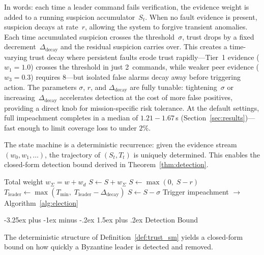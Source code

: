 \documentclass[conference]{IEEEtran}
\makeatletter
\renewcommand{\subsection}{\@startsection{subsection}{2}{\z@}%
  {-3.25ex plus -1ex minus -.2ex}%
  {1.5ex plus .2ex}%
  {\normalfont\normalsize\itshape\centering}}
\makeatother
\begin{document}
In words: each time a leader command fails verification, the evidence weight is added to a running suspicion accumulator~$S_t$. When no fault evidence is present, suspicion decays at rate~$r$, allowing the system to forgive transient anomalies. Each time accumulated suspicion crosses the threshold~$\sigma$, trust drops by a fixed decrement~$\Delta_{\text{decay}}$ and the residual suspicion carries over. This creates a time-varying trust decay where persistent faults erode trust rapidly---Tier~1 evidence ($w_1{=}1.0$) crosses the threshold in just 2~commands, while weaker peer evidence ($w_3{=}0.3$) requires 8---but isolated false alarms decay away before triggering action. The parameters $\sigma$, $r$, and $\Delta_{\text{decay}}$ are fully tunable: tightening~$\sigma$ or increasing~$\Delta_{\text{decay}}$ accelerates detection at the cost of more false positives, providing a direct knob for mission-specific risk tolerance. At the default settings, full impeachment completes in a median of $1.21{-}1.67\,$s (Section~\ref{sec:results})---fast enough to limit coverage loss to under $2\%$.

The state machine is a deterministic recurrence: given the evidence stream $(w_0, w_1, \ldots)$, the trajectory of $(S_t, T_t)$ is uniquely determined. This enables the closed-form detection bound derived in Theorem~\ref{thm:detection}.

\begin{algorithm}[h]
\caption{Suspicion Update and Trust Decay}
\label{alg:suspicion}
\begin{algorithmic}[1]
\REQUIRE Total weight $w_{\Sigma} = w + w_d$
    \STATE $S \leftarrow S + w_{\Sigma}$
\ELSE
    \STATE $S \leftarrow \max(0,\; S - r)$
\ENDIF
{}
    \STATE $T_{\text{leader}} \leftarrow \max(T_{\min},\;
           T_{\text{leader}} - \Delta_{\text{decay}})$
    \STATE $S \leftarrow S - \sigma$
\ENDWHILE
{}
    \STATE Trigger impeachment $\to$ Algorithm~\ref{alg:election}
\ENDIF
\end{algorithmic}
\end{algorithm}

\subsection{Detection Bound}
\label{sec:detection_bound}

The deterministic structure of Definition~\ref{def:trust_sm} yields a closed-form bound on how quickly a Byzantine leader is detected and removed.
\end{document}
